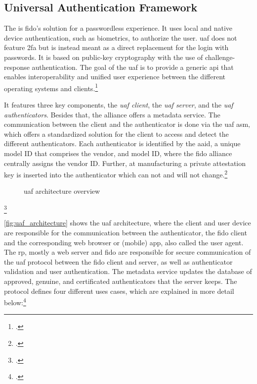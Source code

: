 \subsection{Universal Authentication Framework}

The  is \gls{fido}'s solution for a passwordless experience. It uses local and native device authentication, such as biometrics, to authorize the user. \gls{uaf} does not feature \gls{2fa} but is instead meant as a direct replacement for the login with passwords. It is based on public-key cryptography with the use of challenge-response authentication. The goal of the \gls{uaf} is to provide a generic \gls{api} that enables interoperability and unified user experience between the different operating systems and clients.\footcites[See][249]{Schwartz2018}[See][197--198]{dasgupta2017multi}

It features three key components, the \textit{\gls{uaf} client}, the \textit{\gls{uaf} server}, and the \textit{\gls{uaf} authenticators}. Besides that, the alliance offers a metadata service. The communication between the client and the authenticator is done via the \gls{uaf} \gls{asm}, which offers a standardized solution for the client to access and detect the different authenticators. Each authenticator is identified by the \gls{aaid}, a unique model ID that comprises the vendor, and model ID, where the \gls{fido} alliance centrally assigns the vendor ID. Further, at manufacturing a private attestation key is inserted into the authenticator which can not and will not change.\footcites[See][145]{10.1007/978-3-319-26502-5_10}[See][8]{uaf-protocol}

\begin{figure}[hbt]
	\centering
	
	\caption[\gls{uaf} architecture overview]{\gls{uaf} architecture overview\footnotemark}
	\label{fig:uaf_architecture}
\end{figure}
\footcitetext[Source: diagram by author, based on][4]{uaf-overview}

\autoref{fig:uaf_architecture} shows the \gls{uaf} architecture, where the client and user device are responsible for the communication between the authenticator, the \gls{fido} client and the corresponding web browser or (mobile) app, also called the user agent. The \gls{rp}, mostly a web server and \gls{fido} are responsible for secure communication of the \gls{uaf} protocol between the \gls{fido} client and server, as well as authenticator validation and user authentication. The metadata service updates the database of approved, genuine, and certificated authenticators that the server keeps. The protocol defines four different uses cases, which are explained in more detail below:\footcites[See][4]{uaf-protocol}

